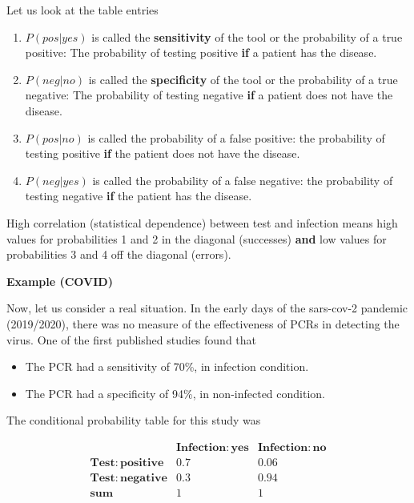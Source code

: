 \documentclass[
]{book}
\providecommand{\tightlist}{%
  \setlength{\itemsep}{0pt}\setlength{\parskip}{0pt}}
\begin{document}
Let us look at the table entries

\begin{enumerate}
\def\labelenumi{\arabic{enumi})}
\item
  \(P(pos| yes)\) is called the \textbf{sensitivity} of the tool or the probability of a true positive: The probability of testing positive \textbf{if} a patient has the disease.
\item
  \(P(neg| no)\) is called the \textbf{specificity} of the tool or the probability of a true negative: The probability of testing negative \textbf{if} a patient does not have the disease.
\item
  \(P(pos| no)\) is called the probability of a false positive: the probability of testing positive \textbf{if} the patient does not have the disease.
\item
  \(P(neg| yes)\) is called the probability of a false negative: the probability of testing negative \textbf{if} the patient has the disease.
\end{enumerate}

High correlation (statistical dependence) between test and infection means high values for probabilities 1 and 2 in the diagonal (successes) \textbf{and} low values for probabilities 3 and 4 off the diagonal (errors).

\textbf{Example (COVID)}

Now, let us consider a real situation. In the early days of the sars-cov-2 pandemic (2019/2020), there was no measure of the effectiveness of PCRs in detecting the virus. One of the first published studies \citep{Woloshin2020FalseNegative} found that

\begin{itemize}
\tightlist
\item
  The PCR had a sensitivity of 70\%, in infection condition.
\item
  The PCR had a specificity of 94\%, in non-infected condition.
\end{itemize}

The conditional probability table for this study was

\[
\begin{array}{cc|c}
    & \mathbf{Infection: yes} & \mathbf{Infection: no} \\ 
    \mathbf{Test: positive} & 0.7 & 0.06 \\ 
    \mathbf{Test: negative} & 0.3 & 0.94 \\ 
    \mathbf{sum} & 1 & 1
\end{array}
\]
\end{document}
